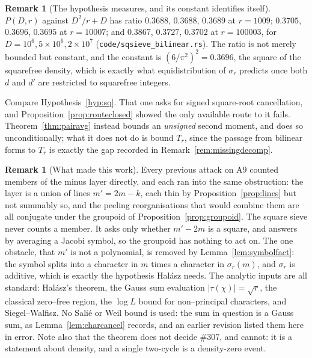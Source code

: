 \documentclass[11pt]{article}
\theoremstyle{definition}
\newtheorem{remark}[theorem]{Remark}
\begin{document}
\begin{remark}[The hypothesis measures, and its constant identifies itself]\label{rem:pairmeasured}
$P(D,r)$ against $D^2/r+D$ has ratio $0.3688$, $0.3688$, $0.3689$ at $r=1009$;
$0.3705$, $0.3696$, $0.3695$ at $r=10007$; and $0.3867$, $0.3727$, $0.3702$ at $r=100003$, for
$D=10^6,5\times10^6,2\times10^7$ \textup{(\texttt{code/sqsieve\_bilinear.rs})}. The ratio is not
merely bounded but constant, and the constant is $(6/\pi^2)^2=0.3696$, the square of the squarefree
density, which is exactly what equidistribution of $\sigma_r$ predicts once both $d$ and $d'$ are
restricted to squarefree integers.

Compare Hypothesis~\ref{hyp:sq}. That one asks for signed square-root
cancellation, and Proposition~\ref{prop:routeclosed} showed the only available route to it fails.
Theorem~\ref{thm:pairavg} instead bounds an \emph{unsigned} second moment, and does so
unconditionally; what it does not do is bound $T_r$, since the passage from bilinear forms to $T_r$
is exactly the gap recorded in Remark~\ref{rem:missingdecomp}.
\end{remark}

\begin{remark}[What made this work]\label{rem:sqsievewhy}
Every previous attack on $\mathrm{A}9$ counted members of the minus layer directly, and each ran
into the same obstruction: the layer is a union of lines $m'=2m-k$, each thin by
Proposition~\ref{prop:lines} but not summably so, and the peeling reorganisations that would combine
them are all conjugate under the groupoid of Proposition~\ref{prop:groupoid}. The square sieve never
counts a member. It asks only whether $m'-2m$ is a square, and answers by averaging a Jacobi symbol,
so the groupoid has nothing to act on. The one obstacle, that $m'$ is not a polynomial, is removed by
Lemma~\ref{lem:symbolfact}: the symbol splits into a character in $m$ times a character in
$\sigma_r(m)$, and $\sigma_r$ is additive, which is exactly the hypothesis Hal\'asz needs. The
analytic inputs are all standard: Hal\'asz's theorem, the Gauss sum evaluation
$|\tau(\chi)|=\sqrt r$, the classical zero--free region, the $\log L$ bound for non--principal
characters, and Siegel--Walfisz. No Sali\'e or Weil bound is used: the sum in question is a Gauss
sum, as Lemma~\ref{lem:charcancel} records, and an earlier revision listed them here in error. Note also that the theorem does not decide \#307, and cannot: it is a statement about
density, and a single two-cycle is a density-zero event.
\end{remark}
\end{document}
